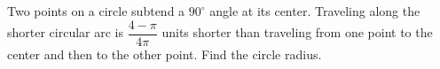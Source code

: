 Two points on a circle subtend a $90^\circ$ angle at its center. Traveling along the shorter circular arc is $\dfrac{4-\pi}{4\pi}$ units shorter than traveling from one point to the center and then to the other point. Find the circle radius.

